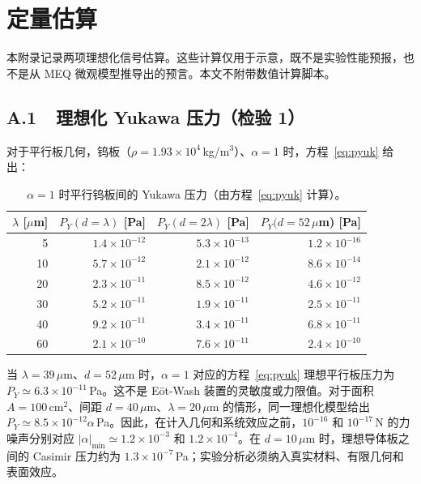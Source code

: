 \documentclass[UTF8,fontset=none,11pt,a4paper]{ctexart}
\begin{document}
\section{定量估算}\label{app:quant}

本附录记录两项理想化信号估算。这些计算仅用于示意，既不是实验性能预报，也不是从 MEQ 微观模型推导出的预言。本文不附带数值计算脚本。

\subsection*{A.1\ \ 理想化 Yukawa 压力（检验 1）}

对于平行板几何，钨板（$\rho=1.93\times10^4\,$kg/m$^3$）、$\alpha=1$ 时，方程~\eqref{eq:pyuk} 给出：

\begin{table}[htbp]
\centering\small
\caption{$\alpha=1$ 时平行钨板间的 Yukawa 压力（由方程~\eqref{eq:pyuk} 计算）。}
\begin{tabular}{@{}rrrr@{}}
\toprule
$\lambda$ [$\mu$m] & $P_Y(d=\lambda)$ [Pa] & $P_Y(d=2\lambda)$ [Pa] & $P_Y(d=52\,\mu$m) [Pa]\\
\midrule
5  & $1.4\times10^{-12}$ & $5.3\times10^{-13}$ & $1.2\times10^{-16}$ \\
10 & $5.7\times10^{-12}$ & $2.1\times10^{-12}$ & $8.6\times10^{-14}$ \\
20 & $2.3\times10^{-11}$ & $8.5\times10^{-12}$ & $4.6\times10^{-12}$ \\
30 & $5.2\times10^{-11}$ & $1.9\times10^{-11}$ & $2.5\times10^{-11}$ \\
40 & $9.2\times10^{-11}$ & $3.4\times10^{-11}$ & $6.8\times10^{-11}$ \\
60 & $2.1\times10^{-10}$ & $7.6\times10^{-11}$ & $2.4\times10^{-10}$ \\
\bottomrule
\end{tabular}
\end{table}

\noindent
当 $\lambda=39\,\mu$m、$d=52\,\mu$m 时，$\alpha=1$ 对应的方程~\eqref{eq:pyuk} 理想平行板压力为 $P_Y\simeq6.3\times10^{-11}\,$Pa。这不是 Eöt-Wash 装置的灵敏度或力限值。对于面积 $A=100\,$cm$^2$、间距 $d=40\,\mu$m、$\lambda=20\,\mu$m 的情形，同一理想化模型给出 $P_Y\simeq8.5\times10^{-12}\alpha\,$Pa。因此，在计入几何和系统效应之前，$10^{-16}$ 和 $10^{-17}\,$N 的力噪声分别对应 $|\alpha|_{\min}\simeq1.2\times10^{-3}$ 和 $1.2\times10^{-4}$。在 $d=10\,\mu$m 时，理想导体板之间的 Casimir 压力约为 $1.3\times10^{-7}\,$Pa；实验分析必须纳入真实材料、有限几何和表面效应。
\end{document}
